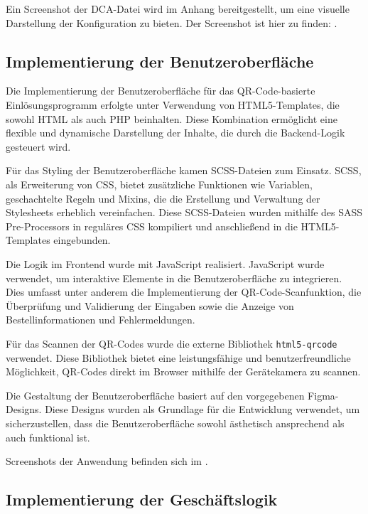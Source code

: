 Ein Screenshot der DCA-Datei wird im Anhang bereitgestellt, um eine visuelle Darstellung der Konfiguration zu bieten. Der Screenshot ist hier zu finden: .

\subsection{Implementierung der Benutzeroberfläche}
\label{sec:ImplementierungBenutzeroberflaeche}

Die Implementierung der Benutzeroberfläche für das QR-Code-basierte Einlösungsprogramm erfolgte unter Verwendung von HTML5-Templates, die sowohl HTML als auch PHP beinhalten. Diese Kombination ermöglicht eine flexible und dynamische Darstellung der Inhalte, die durch die Backend-Logik gesteuert wird.

Für das Styling der Benutzeroberfläche kamen SCSS-Dateien zum Einsatz. SCSS, als Erweiterung von CSS, bietet zusätzliche Funktionen wie Variablen, geschachtelte Regeln und Mixins, die die Erstellung und Verwaltung der Stylesheets erheblich vereinfachen. Diese SCSS-Dateien wurden mithilfe des SASS Pre-Processors in reguläres CSS kompiliert und anschließend in die HTML5-Templates eingebunden.

Die Logik im Frontend wurde mit JavaScript realisiert. JavaScript wurde verwendet, um interaktive Elemente in die Benutzeroberfläche zu integrieren. Dies umfasst unter anderem die Implementierung der QR-Code-Scanfunktion, die Überprüfung und Validierung der Eingaben sowie die Anzeige von Bestellinformationen und Fehlermeldungen.

Für das Scannen der QR-Codes wurde die externe Bibliothek \texttt{html5-qrcode} verwendet. Diese Bibliothek bietet eine leistungsfähige und benutzerfreundliche Möglichkeit, QR-Codes direkt im Browser mithilfe der Gerätekamera zu scannen.

Die Gestaltung der Benutzeroberfläche basiert auf den vorgegebenen Figma-Designs. Diese Designs wurden als Grundlage für die Entwicklung verwendet, um sicherzustellen, dass die Benutzeroberfläche sowohl ästhetisch ansprechend als auch funktional ist.

Screenshots der Anwendung befinden sich im .


\subsection{Implementierung der Geschäftslogik}
\label{sec:ImplementierungGeschaeftslogik}


